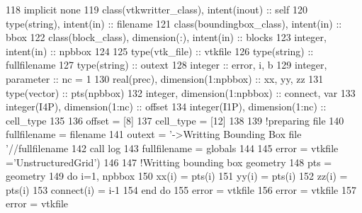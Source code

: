 \begin{DoxyCode}
118     \textcolor{keywordtype}{implicit none}
119     \textcolor{keywordtype}{class}(vtkwritter\_class), \textcolor{keywordtype}{intent(inout)} :: self
120     \textcolor{keywordtype}{type}(string), \textcolor{keywordtype}{intent(in)} :: filename
121     \textcolor{keywordtype}{class}(boundingbox\_class), \textcolor{keywordtype}{intent(in)} :: bbox
122     \textcolor{keywordtype}{class}(block\_class), \textcolor{keywordtype}{dimension(:)}, \textcolor{keywordtype}{intent(in)} :: blocks
123     \textcolor{keywordtype}{integer}, \textcolor{keywordtype}{intent(in)} :: npbbox
124     
125     \textcolor{keywordtype}{type}(vtk\_file) :: vtkfile
126     \textcolor{keywordtype}{type}(string) :: fullfilename
127     \textcolor{keywordtype}{type}(string) :: outext
128     \textcolor{keywordtype}{integer} :: error, i, b
129     \textcolor{keywordtype}{integer}, \textcolor{keywordtype}{parameter} :: nc = 1
130     \textcolor{keywordtype}{real(prec)}, \textcolor{keywordtype}{dimension(1:npbbox)} :: xx, yy, zz
131     \textcolor{keywordtype}{type}(vector) :: pts(npbbox)
132     \textcolor{keywordtype}{integer}, \textcolor{keywordtype}{dimension(1:npbbox)} :: connect, var
133     \textcolor{keywordtype}{integer(I4P)}, \textcolor{keywordtype}{dimension(1:nc)} :: offset
134     \textcolor{keywordtype}{integer(I1P)}, \textcolor{keywordtype}{dimension(1:nc)} :: cell\_type
135     
136     offset = [8]
137     cell\_type = [12]
138     
139     \textcolor{comment}{!preparing file}
140     fullfilename = filename%
141     outext = \textcolor{stringliteral}{'->Writting Bounding Box file '}//fullfilename
142     \textcolor{keyword}{call }log%
143     fullfilename = globals%
144     
145     error = vtkfile%
      =\textcolor{stringliteral}{'UnstructuredGrid'})
146     
147     \textcolor{comment}{!Writting bounding box geometry}
148     pts = geometry%
149     \textcolor{keywordflow}{do} i=1, npbbox
150         xx(i) = pts(i)%
151         yy(i) = pts(i)%
152         zz(i) = pts(i)%
153         connect(i) = i-1
154 \textcolor{keywordflow}{    end do}    
155     error = vtkfile%
156     error = vtkfile%
157     error = vtkfile%

\end{DoxyCode}
